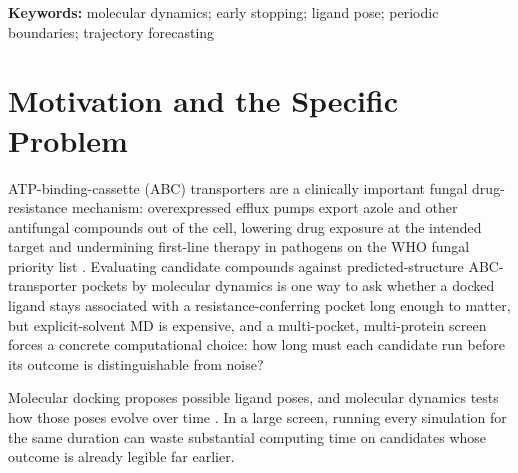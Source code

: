 \documentclass[11pt]{article}
\begin{document}
\begin{abstract}
The main contribution is not the coordinate-correction procedure itself, which is established practice, but what it reveals once applied: a same-trajectory pose-persistence signal is already detectable by 5 ns, the earliest checkpoint tested, and does not improve monotonically at later checkpoints. That signal transfers strongly within the same running trajectory but only near chance to a separately launched trajectory from the identical docked structure -- a pattern consistent with trajectory-conditioned, path-specific persistence rather than a proven general law of path-dependence. That mechanistic finding is converted into an explicit, bounded compute/false-stop triage policy. It does not establish binding, biological activity, or replica-level molecular stability. The stopping result is a retrospective development-cohort estimate that requires a frozen 5 ns prospective shadow test. A lightweight software tool is planned that applies this measurement directly to a running simulation's saved trajectory frames alongside the live job, reporting a single stop/continue score together with a confidence range, rather than an opaque model prediction.
\end{abstract}

\noindent\textbf{Keywords:} molecular dynamics; early stopping; ligand pose; periodic boundaries; trajectory forecasting

\tableofcontents
\newpage

\section{Motivation and the Specific Problem}
\label{sec:motivation}

ATP-binding-cassette (ABC) transporters are a clinically important fungal drug-resistance mechanism: overexpressed efflux pumps export azole and other antifungal compounds out of the cell, lowering drug exposure at the intended target and undermining first-line therapy in pathogens on the WHO fungal priority list \cite{WHO2022FPPL,li_azole}. Evaluating candidate compounds against predicted-structure ABC-transporter pockets by molecular dynamics is one way to ask whether a docked ligand stays associated with a resistance-conferring pocket long enough to matter, but explicit-solvent MD is expensive, and a multi-pocket, multi-protein screen forces a concrete computational choice: how long must each candidate run before its outcome is distinguishable from noise?

Molecular docking proposes possible ligand poses, and molecular dynamics tests how those poses evolve over time \cite{meng2011docking,hollingsworth2018md}. In a large screen, running every simulation for the same duration can waste substantial computing time on candidates whose outcome is already legible far earlier.
\end{document}
